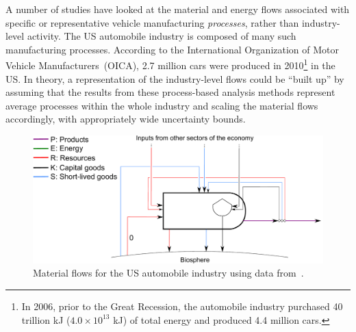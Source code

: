 A number of studies have looked at 
the material and energy flows 
associated with specific or representative vehicle manufacturing 
\emph{processes}, rather than industry-level
activity.\cite{Sullivan1998, MacLean1998,Schweimer2000,
McCleese2002,MacLean2003, Burnham2006,Sullivan2010, Hawkins2012}
The US automobile industry is composed
of many such manufacturing processes.
According to the International Organization of 
Motor Vehicle Manufacturers~(OICA), 
2.7 million cars were produced in 2010\footnote{In 2006, 
prior to the Great Recession, 
the automobile industry purchased 
40 trillion kJ ($4.0 \times 10^{13}$ kJ) of total energy and 
produced 4.4 million cars.
} 
in the US.\cite{Motor-Vehicle-Manufacturers-OICA:2014aa}
In theory,
a representation of the industry-level flows
could be ``built up'' by assuming that the results from
these process-based analysis methods represent average
processes within the whole industry and 
scaling the material flows accordingly,
with appropriately wide uncertainty bounds.



\begin{figure}[!ht]
\centering
\includegraphics[width=\linewidth]{Part_1/Chapter_Materials/images/PERKS_basic_unit_materials_auto_ind.pdf}
\caption[Material flows for the US automobile industry]{Material 
flows for the US automobile industry using data from~\cite{Sullivan1998, 
MacLean1998,Schweimer2000, McCleese2002,MacLean2003, Burnham2006,
Sullivan2010, Hawkins2012}.}
\label{fig:PERKS_materials_auto}
\end{figure}

